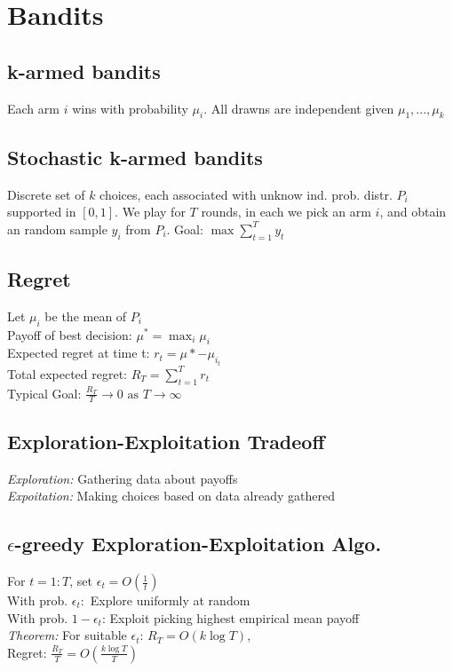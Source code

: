 \section{Bandits}
\subsection*{k-armed bandits}
Each arm $i$ wins with probability $\mu_i$. All drawns are independent given $\mu_1,...,\mu_k$

\subsection*{Stochastic k-armed bandits}
Discrete set of $k$ choices, each associated with unknow ind. prob. distr. $P_i$ supported in $[0,1]$. We play for $T$ rounds, in each we pick an arm $i$, and obtain an random sample $y_i$ from $P_i$. Goal: $\max \sum_{t=1}^T y_t$

\subsection*{Regret}
Let $\mu_i$ be the mean of $P_i$\\
Payoff of best decision: $\mu^* = \max_i \mu_i$\\
Expected regret at time t: $r_t=\mu*-\mu_{i_t}$\\
Total expected regret: $R_T = \sum_{t=1}^T r_t$\\
Typical Goal: $\frac{R_T}{T} \rightarrow 0 \text{ as } T \rightarrow\infty$

\subsection*{Exploration-Exploitation Tradeoff}
\emph{Exploration:} Gathering data about payoffs\\
\emph{Expoitation:} Making choices based on data already gathered

\subsection*{$\epsilon$-greedy Exploration-Exploitation Algo.}
For $t=1:T$, set $\epsilon_t = O \left ( \frac{1}{t} \right )$\\
With prob. $\epsilon_t:$ Explore uniformly at random\\
With prob. $1- \epsilon_t$: Exploit picking highest empirical mean payoff\\
\emph{Theorem:} For suitable $\epsilon_t$: $R_T = O(k \log T)$,\\
Regret: $\frac{R_T}{T} = O \left ( \frac{k \log T}{T} \right )$

